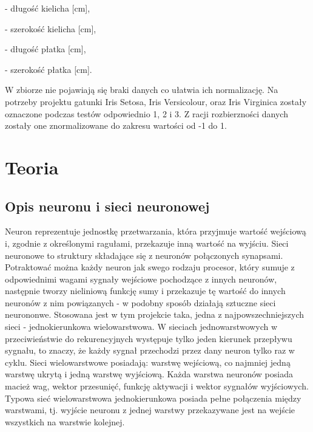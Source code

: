 \documentclass[a4paper, 12pt]{report}
\begin{document}
- długość kielicha [cm],

- szerokość kielicha [cm],

- długość płatka [cm],

- szerokość płatka [cm].

W zbiorze nie pojawiają się braki danych co ułatwia ich normalizację. Na potrzeby projektu gatunki Iris Setosa, Iris Versicolour, oraz Iris Virginica zostały oznaczone podczas testów odpowiednio 1, 2 i 3. Z racji rozbierzności danych zostały one znormalizowane do zakresu wartości od -1 do 1.

\chapter{Teoria}
\section{Opis neuronu i sieci neuronowej}
Neuron reprezentuje jednostkę przetwarzania, która przyjmuje wartość wejściową i, zgodnie z określonymi ragułami, przekazuje inną wartość na wyjściu. Sieci neuronowe to struktury składające się z neuronów połączonych synapsami. Potraktować można każdy neuron jak  swego rodzaju procesor, który sumuje z odpowiednimi wagami sygnały wejściowe pochodzące z innych neuronów, następnie tworzy nieliniową funkcję sumy i przekazuje tę wartość do innych neuronów z nim powiązanych - w podobny sposób działają sztuczne sieci neurononwe. Stosowana jest w tym projekcie taka, jedna z najpowszechniejszych sieci - jednokierunkowa wielowarstwowa. W sieciach jednowarstwowych w przeciwieństwie do rekurencyjnych występuje tylko jeden kierunek przepływu sygnału, to znaczy, że każdy sygnał przechodzi przez dany neuron tylko raz w cyklu. Sieci wielowarstwowe posiadają: warstwę wejściową, co najmniej jedną warstwę ukrytą  i jedną warstwę wyjściową. Każda warstwa neuronów posiada macież wag, wektor przesunięć, funkcję aktywacji i wektor sygnałów wyjściowych. Typowa sieć wielowarstwowa jednokierunkowa posiada pełne połączenia między warstwami, tj. wyjście neuronu z jednej warstwy przekazywane jest na wejście wszystkich na warstwie kolejnej.
\end{document}
